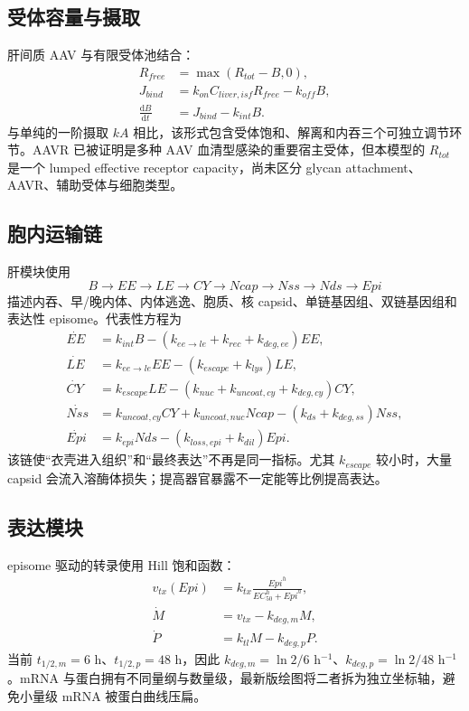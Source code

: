 \documentclass[UTF8,11pt,a4paper]{ctexart}
\newcommand{\dd}{\mathrm{d}}
\begin{document}
\subsection{受体容量与摄取}
肝间质 AAV 与有限受体池结合：
\begin{align}
R_{free}&=\max(R_{tot}-B,0),\\
J_{bind}&=k_{on}C_{liver,isf}R_{free}-k_{off}B,\\
\frac{\dd B}{\dd t}&=J_{bind}-k_{int}B.
\end{align}
与单纯的一阶摄取 $kA$ 相比，该形式包含受体饱和、解离和内吞三个可独立调节环节。AAVR 已被证明是多种 AAV 血清型感染的重要宿主受体\cite{pillay2016}，但本模型的 $R_{tot}$ 是一个 lumped effective receptor capacity，尚未区分 glycan attachment、AAVR、辅助受体与细胞类型。

\subsection{胞内运输链}
肝模块使用
\[
B\rightarrow EE\rightarrow LE\rightarrow CY\rightarrow Ncap
\rightarrow Nss\rightarrow Nds\rightarrow Epi
\]
描述内吞、早/晚内体、内体逃逸、胞质、核 capsid、单链基因组、双链基因组和表达性 episome。代表性方程为
\begin{align}
\dot{EE}&=k_{int}B-(k_{ee\to le}+k_{rec}+k_{deg,ee})EE,\\
\dot{LE}&=k_{ee\to le}EE-(k_{escape}+k_{lys})LE,\\
\dot{CY}&=k_{escape}LE-(k_{nuc}+k_{uncoat,cy}+k_{deg,cy})CY,\\
\dot{Nss}&=k_{uncoat,cy}CY+k_{uncoat,nuc}Ncap-(k_{ds}+k_{deg,ss})Nss,\\
\dot{Epi}&=k_{epi}Nds-(k_{loss,epi}+k_{dil})Epi.
\end{align}
该链使“衣壳进入组织”和“最终表达”不再是同一指标。尤其 $k_{escape}$ 较小时，大量 capsid 会流入溶酶体损失；提高器官暴露不一定能等比例提高表达\cite{trafficking2012,trafficking2021}。

\subsection{表达模块}
episome 驱动的转录使用 Hill 饱和函数：
\begin{align}
v_{tx}(Epi)&=k_{tx}\frac{Epi^h}{EC_{50}^h+Epi^h},\\
\dot M&=v_{tx}-k_{deg,m}M,\\
\dot P&=k_{tl}M-k_{deg,p}P.
\end{align}
当前 $t_{1/2,m}=6$ h、$t_{1/2,p}=48$ h，因此 $k_{deg,m}=\ln2/6$ h$^{-1}$、$k_{deg,p}=\ln2/48$ h$^{-1}$。mRNA 与蛋白拥有不同量纲与数量级，最新版绘图将二者拆为独立坐标轴，避免小量级 mRNA 被蛋白曲线压扁。
\end{document}
